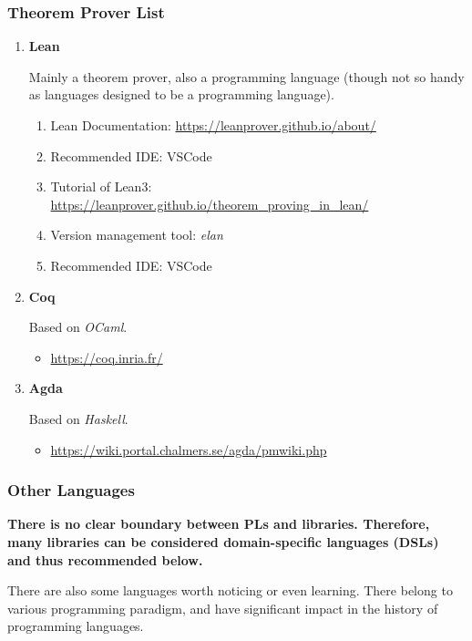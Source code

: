 \documentclass{article}
\begin{document}
\subsubsection{Theorem Prover List}
\begin{enumerate}
\item \textbf{Lean}

Mainly a theorem prover, also a programming language (though not so handy as languages designed to be a programming language).

\begin{enumerate}
    \item Lean Documentation:
    \href{https://leanprover.github.io/about/}{https://leanprover.github.io/about/}
    \item Recommended IDE: VSCode
    \item Tutorial of Lean3:\\
    \href{https://leanprover.github.io/theorem_proving_in_lean/}{https://leanprover.github.io/theorem_proving_in_lean/}
    \item Version management tool: \emph{elan}
    \item Recommended IDE: VSCode
\end{enumerate}

\item \textbf{Coq}

    Based on \emph{OCaml}.
    \begin{itemize}
        \item \href{https://coq.inria.fr/}{https://coq.inria.fr/}
    \end{itemize}

\item \textbf{Agda}

    Based on \emph{Haskell}.
    \begin{itemize}
        \item \href{https://wiki.portal.chalmers.se/agda/pmwiki.php}{https://wiki.portal.chalmers.se/agda/pmwiki.php}
    \end{itemize}
\end{enumerate}

\subsubsection{Other Languages}
\textbf{There is no clear boundary between PLs and libraries. Therefore, many libraries can be considered domain-specific languages (DSLs) and thus recommended below.}

There are also some languages worth noticing or even learning.
There belong to various programming paradigm, and have significant impact in the history of programming languages.
\end{document}
